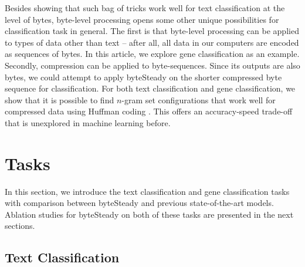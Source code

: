 \documentclass{article}
\begin{document}
Besides showing that such bag of tricks work well for text classification at the level of bytes, byte-level processing opens some other unique possibilities for classification task in general. The first is that byte-level processing can be applied to types of data other than text -- after all, all data in our computers are encoded as sequences of bytes. In this article, we explore gene classification as an example. Secondly, compression can be applied to byte-sequences. Since its outputs are also bytes, we could attempt to apply byteSteady on the shorter compressed byte sequence for classification. For both text classification and gene classification, we show that it is possible to find \(n\)-gram set configurations that work well for compressed data using Huffman coding \cite{H52}. This offers an accuracy-speed trade-off that is unexplored in machine learning before.

\section{Tasks}

In this section, we introduce the text classification and gene classification tasks with comparison between byteSteady and previous state-of-the-art models. Ablation studies for byteSteady on both of these tasks are presented in the next sections.

\subsection{Text Classification}
\end{document}
